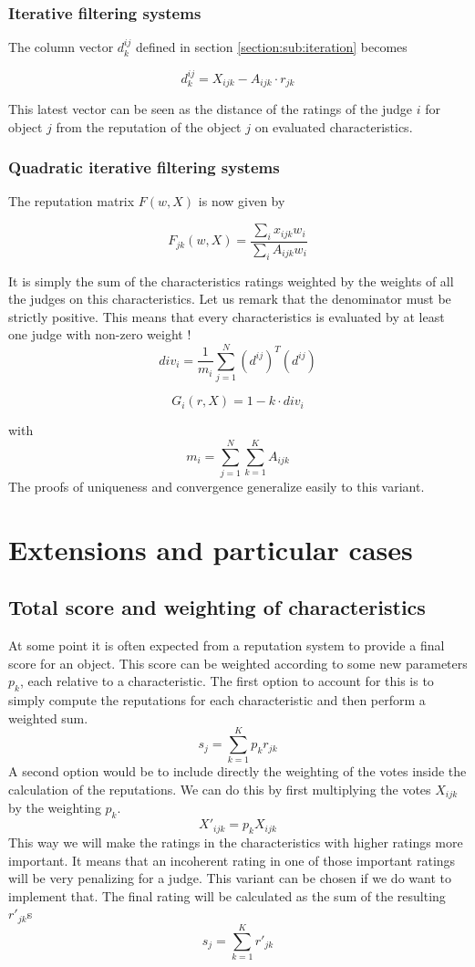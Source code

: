 \documentclass[12pt,a4paper]{article}
\begin{document}
\subsubsection{Iterative filtering systems}
 The column vector $d_k^{ij}$ defined in section \ref{section:sub:iteration} becomes
 
\[
    d^{ij}_k = X_{ijk} - A_{ijk}   \cdot r_{jk}
\]

This latest vector can be seen as the distance of the ratings of the judge $i$ for object $j$ from the reputation of the object $j$ on evaluated characteristics.

\subsubsection{Quadratic iterative filtering systems}

The reputation matrix $F(w, X)$ is now given by

\[
    F_{jk}(w, X) = \frac{\sum_i x_{ijk}w_i}{\sum_i A_{ijk}w_i}
\]

It is simply the sum of the characteristics ratings weighted by the weights of all the judges on this characteristics. Let us remark that the denominator must be strictly positive. This means that every characteristics is evaluated by at least one judge with non-zero weight !\\

\[
    div_i = \frac{1}{m_i} \sum_{j=1}^{N} (d^{ij})^T(d^{ij})
\]

\[
    G_i(r,X) = 1 - k \cdot div_i
\]

with
\[
    m_i = \sum_{j=1}^{N} \sum_{k=1}^{K} A_{ijk} 
\]
The proofs of uniqueness and convergence generalize easily to this variant.

\section{Extensions and particular cases}
\subsection{Total score and weighting of characteristics}
At some point it is often expected from a reputation system to provide a final score for an object. This score can be weighted according to some new parameters $p_k$, each relative to a characteristic.
The first option to account for this is to simply compute the reputations for each characteristic and then perform a weighted sum.
$$ s_j = \sum_{k=1}^K p_k r_{jk} $$
A second option would be to include directly the weighting of the votes inside the calculation of the reputations. We can do this by first multiplying the votes $X_{ijk}$ by the weighting $p_k$. 
$$X'_{ijk} = p_k X_{ijk}$$
This way we will make the ratings in the characteristics with higher ratings more important. It means that an incoherent rating in one of those important ratings will be very penalizing for a judge. This variant can be chosen if we do want to implement that.
The final rating will be calculated as the sum of the resulting $r'_{jk}$s
$$ s_j = \sum_{k=1}^K r'_{jk}$$
\end{document}
